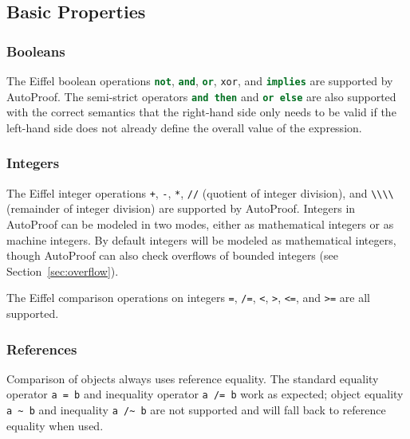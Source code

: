 \documentclass[a4paper,12pt]{article}
\newcommand{\AutoProof}{Auto\-Proof\xspace}
\newcommand{\e}[1]{\mbox{\lstinline[language=Eiffel]|#1|}}
\begin{document}
\subsection{Basic Properties}

\subsubsection*{Booleans}

The Eiffel boolean operations \e{not}, \e{and}, \e{or}, \e{xor}, and \e{implies} are supported by \AutoProof. The semi-strict operators \e{and then} and \e{or else} are also supported with the correct semantics that the right-hand side only needs to be valid if the left-hand side does not already define the overall value of the expression.

\subsubsection*{Integers}

The Eiffel integer operations \e{+}, \e{-}, \e{*}, \e{//} (quotient of integer division), and \e{\\\\} (remainder of integer division) are supported by \AutoProof. Integers in \AutoProof can be modeled in two modes, either as mathematical integers or as machine integers. By default integers will be modeled as mathematical integers, though \AutoProof can also check overflows of bounded integers (see Section~\ref{sec:overflow}).

The Eiffel comparison operations on integers \e{=}, \e{/=}, \e{<}, \e{>}, \e{<=}, and \e{>=} are all supported.

\subsubsection*{References}

Comparison of objects always uses reference equality. The standard equality operator \e{a = b} and inequality operator \e{a /= b} work as expected; object equality \e{a ~ b} and inequality \e{a /~ b} are not supported and will fall back to reference equality when used.
\end{document}
